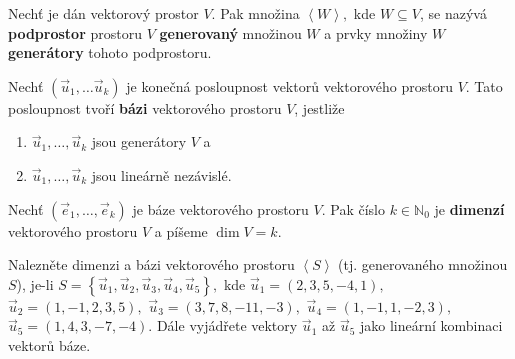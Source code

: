 \begin{definition}
    Nechť je dán vektorový prostor $V$. Pak množina $\left<  W \right>,$ kde $
    W \subseteq V$, se nazývá \textbf{podprostor} prostoru $V$ \textbf{generovaný}
    množinou $W$ a prvky množiny $W$ \textbf{generátory} tohoto podprostoru.
\end{definition}

\begin{definition}
    Nechť $(\vec u_1, \dots \vec u_k)$ je konečná posloupnost vektorů vektorového
    prostoru $V$. Tato posloupnost tvoří \textbf{bázi} vektorového prostoru $V$, jestliže
    \begin{enumerate}[$i.$]
    \item $\vec u_1, \dots, \vec u_k$ jsou generátory $V$ a
   	\item $\vec u_1, \dots, \vec u_k$ jsou lineárně nezávislé.
    \end{enumerate}
\end{definition}

\begin{definition}
Nechť $(\vec e_1,\dots, \vec e_k)$ je báze vektorového prostoru $V$. Pak číslo $k \in
\mathbb N_0$ je \textbf{dimenzí} vektorového prostoru $V$ a píšeme $\dim V=k$.
\end{definition}

\begin{priklad}
Nalezněte dimenzi a bázi vektorového prostoru $\left<  S \right>$ (tj. generovaného množinou $S$), je-li $S = \left
\{ \vec u_1,\vec u_2,\vec u_3,\vec u_4,\vec u_5 \right \}, $
kde
$\vec u_1=(2,3,5,-4,1),$ $\vec u_2=(1,-1,2,3,5),$ $\vec u_3=(3,7,8,-11,-3),$ $\vec u_4=(1,-1,1,-2,3),$ $\vec u_5=(1,4,3,-7,-4).$
Dále vyjádřete vektory $\vec u_1$ až $\vec u_5$ jako lineární kombinaci vektorů báze.
\end{priklad}

